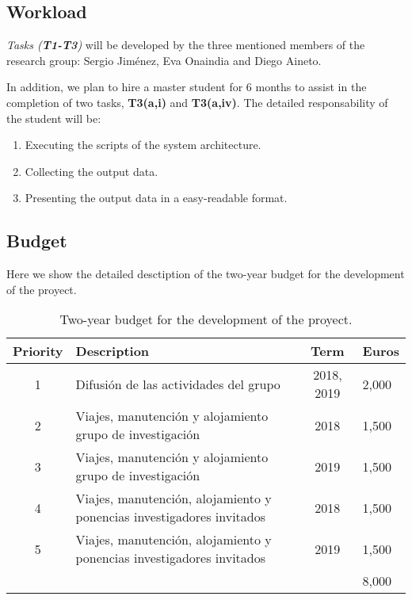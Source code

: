 \documentclass[10pt,a4paper]{paper}
\begin{document}
\subsection{Workload}

{\em Tasks ({\bf T1-T3})} will be developed by the three mentioned members of the research group: Sergio Jiménez, Eva Onaindia and Diego Aineto.

In addition, we plan to hire a master student for 6 months to assist in the completion of two tasks, {\bf T3(a,i)} and {\bf T3(a,iv)}. The detailed responsability of the student will be:
\begin{enumerate}
\item Executing the scripts of the system architecture.
\item Collecting the output data.
\item Presenting the output data in a easy-readable format.
\end{enumerate}


\subsection{Budget}
Here we show the detailed desctiption of the two-year budget for the development of the proyect.

\begin{table}[hbt!]
\begin{small}  
  \begin{tabular}{clc|l}
    {\bf Priority} & {\bf Description} & {\bf Term} & {\bf Euros} \\\hline
1 & {\scriptsize Difusión de las actividades del grupo} & 2018, 2019 & 2,000\\    
2 & {\scriptsize Viajes, manutención y alojamiento grupo de investigación} & 2018 & 1,500\\
3 & {\scriptsize Viajes, manutención y alojamiento grupo de investigación} & 2019 & 1,500\\
4 & {\scriptsize Viajes, manutención, alojamiento y ponencias investigadores invitados} & 2018 & 1,500\\
5 & {\scriptsize Viajes, manutención, alojamiento y ponencias investigadores invitados} & 2019 & 1,500\\\hline
\multicolumn{3}{l|}{} & 8,000 \\
  \end{tabular}
\end{small}
\caption{\small Two-year budget for the development of the proyect.}
\end{table}
\end{document}
